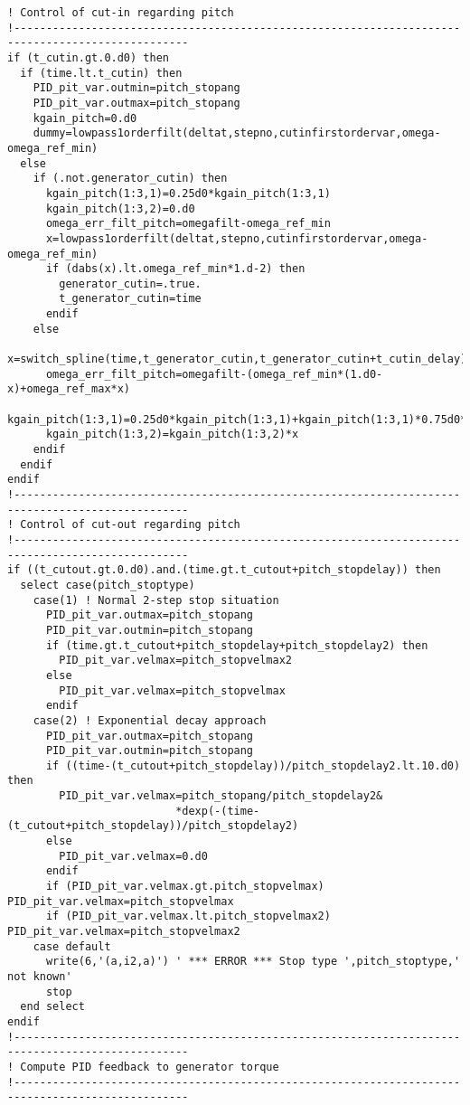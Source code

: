 {\begin{verbatim}
! Control of cut-in regarding pitch
!-------------------------------------------------------------------------------------------------
if (t_cutin.gt.0.d0) then
  if (time.lt.t_cutin) then
    PID_pit_var.outmin=pitch_stopang
    PID_pit_var.outmax=pitch_stopang
    kgain_pitch=0.d0
    dummy=lowpass1orderfilt(deltat,stepno,cutinfirstordervar,omega-omega_ref_min)
  else
    if (.not.generator_cutin) then
      kgain_pitch(1:3,1)=0.25d0*kgain_pitch(1:3,1)
      kgain_pitch(1:3,2)=0.d0
      omega_err_filt_pitch=omegafilt-omega_ref_min
      x=lowpass1orderfilt(deltat,stepno,cutinfirstordervar,omega-omega_ref_min)
      if (dabs(x).lt.omega_ref_min*1.d-2) then
        generator_cutin=.true.
        t_generator_cutin=time
      endif
    else
      x=switch_spline(time,t_generator_cutin,t_generator_cutin+t_cutin_delay)
      omega_err_filt_pitch=omegafilt-(omega_ref_min*(1.d0-x)+omega_ref_max*x)
      kgain_pitch(1:3,1)=0.25d0*kgain_pitch(1:3,1)+kgain_pitch(1:3,1)*0.75d0*x
      kgain_pitch(1:3,2)=kgain_pitch(1:3,2)*x
    endif
  endif
endif
!-------------------------------------------------------------------------------------------------
! Control of cut-out regarding pitch
!-------------------------------------------------------------------------------------------------
if ((t_cutout.gt.0.d0).and.(time.gt.t_cutout+pitch_stopdelay)) then
  select case(pitch_stoptype)
    case(1) ! Normal 2-step stop situation
      PID_pit_var.outmax=pitch_stopang
      PID_pit_var.outmin=pitch_stopang
      if (time.gt.t_cutout+pitch_stopdelay+pitch_stopdelay2) then
        PID_pit_var.velmax=pitch_stopvelmax2
      else
        PID_pit_var.velmax=pitch_stopvelmax
      endif
    case(2) ! Exponential decay approach
      PID_pit_var.outmax=pitch_stopang
      PID_pit_var.outmin=pitch_stopang
      if ((time-(t_cutout+pitch_stopdelay))/pitch_stopdelay2.lt.10.d0) then
        PID_pit_var.velmax=pitch_stopang/pitch_stopdelay2&
                          *dexp(-(time-(t_cutout+pitch_stopdelay))/pitch_stopdelay2)
      else
        PID_pit_var.velmax=0.d0
      endif
      if (PID_pit_var.velmax.gt.pitch_stopvelmax) PID_pit_var.velmax=pitch_stopvelmax
      if (PID_pit_var.velmax.lt.pitch_stopvelmax2) PID_pit_var.velmax=pitch_stopvelmax2
    case default
      write(6,'(a,i2,a)') ' *** ERROR *** Stop type ',pitch_stoptype,' not known'
      stop
  end select
endif
!-------------------------------------------------------------------------------------------------
! Compute PID feedback to generator torque
!-------------------------------------------------------------------------------------------------

\end{verbatim}}
